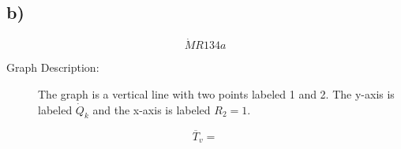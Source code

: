 

\subsection*{b)}

\[
\dot{M} R134a
\]

\begin{description}
    \item[Graph Description:] The graph is a vertical line with two points labeled 1 and 2. The y-axis is labeled \( \dot{Q}_k \) and the x-axis is labeled \( R_2 = 1 \).
\end{description}

\[
\overline{T}_v = 
\]